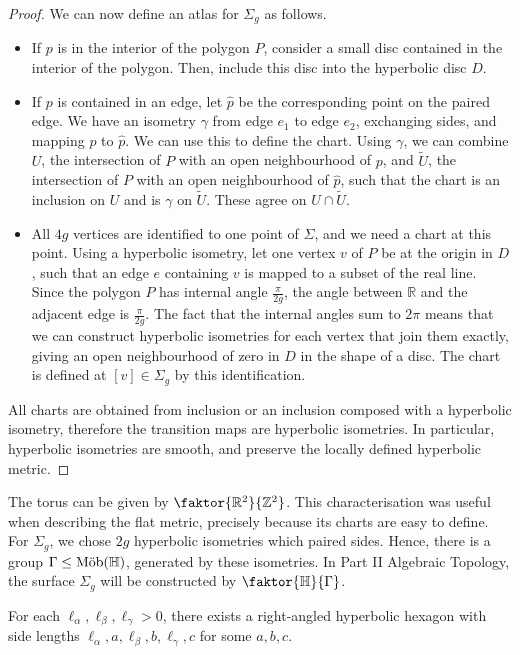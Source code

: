 \begin{proof}
	We can now define an atlas for $\Sigma_g$ as follows.
	\begin{itemize}
		\item If $p$ is in the interior of the polygon $P$, consider a small disc contained in the interior of the polygon.
		      Then, include this disc into the hyperbolic disc $D$.
		\item If $p$ is contained in an edge, let $\hat p$ be the corresponding point on the paired edge.
		      We have an isometry $\gamma$ from edge $e_1$ to edge $e_2$, exchanging sides, and mapping $p$ to $\hat p$.
		      We can use this to define the chart.
		      Using $\gamma$, we can combine $U$, the intersection of $P$ with an open neighbourhood of $p$, and $\widetilde U$, the intersection of $P$ with an open neighbourhood of $\hat p$, such that the chart is an inclusion on $U$ and is $\gamma$ on $\widetilde U$.
		      These agree on $U \cap \widetilde U$.
		\item All $4g$ vertices are identified to one point of $\Sigma$, and we need a chart at this point.
		      Using a hyperbolic isometry, let one vertex $v$ of $P$ be at the origin in $D$, such that an edge $e$ containing $v$ is mapped to a subset of the real line.
		      Since the polygon $P$ has internal angle $\frac{\pi}{2g}$, the angle between $\mathbb R$ and the adjacent edge is $\frac{\pi}{2g}$.
		      The fact that the internal angles sum to $2\pi$ means that we can construct hyperbolic isometries for each vertex that join them exactly, giving an open neighbourhood of zero in $D$ in the shape of a disc.
		      The chart is defined at $[v] \in \Sigma_g$ by this identification.
	\end{itemize}
	All charts are obtained from inclusion or an inclusion composed with a hyperbolic isometry, therefore the transition maps are hyperbolic isometries.
	In particular, hyperbolic isometries are smooth, and preserve the locally defined hyperbolic metric.
\end{proof}
\begin{remark}
	The torus can be given by $\faktor{\mathbb R^2}{\mathbb Z^2}$.
	This characterisation was useful when describing the flat metric, precisely because its charts are easy to define.
	For $\Sigma_g$, we chose $2g$ hyperbolic isometries which paired sides.
	Hence, there is a group $\Gamma \leq \text{M\"ob}(\mathbb H)$, generated by these isometries.
	In Part II Algebraic Topology, the surface $\Sigma_g$ will be constructed by $\faktor{\mathbb H}{\Gamma}$.
\end{remark}
\begin{lemma}
	For each $\ell_\alpha, \ell_\beta, \ell_\gamma > 0$, there exists a right-angled hyperbolic hexagon with side lengths $\ell_\alpha, a, \ell_\beta, b, \ell_\gamma, c$ for some $a,b,c$.
\end{lemma}
